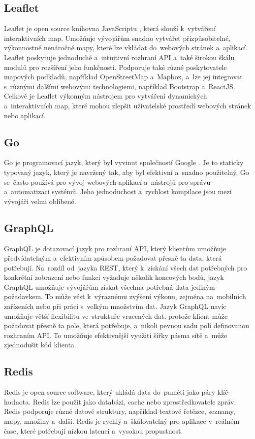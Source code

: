 \subsection{Leaflet} Leaflet je open source knihovna JavaScriptu \cite{leaflet}, která slouží k~vytváření interaktivních map. Umožňuje vývojářům snadno vytvářet přizpůsobitelné, výkonnostně nenáročné mapy, které lze vkládat do~webových stránek a~aplikací. Leaflet poskytuje jednoduché a~intuitivní rozhraní API a~také širokou škálu modulů pro rozšíření jeho funkčnosti. Podporuje také různé poskytovatele mapových podkladů, například OpenStreetMap a~Mapbox, a~lze jej integrovat s~různými dalšími webovými technologiemi, například Bootstrap a~ReactJS. Celkově je Leaflet výkonným nástrojem pro vytváření dynamických a~interaktivních map, které mohou zlepšit uživatelské prostředí webových stránek nebo aplikací.
\subsection{Go} Go je programovací jazyk, který byl vyvinut společností Google \cite{go}. Je to staticky typovaný jazyk, který je navržený tak, aby byl efektivní a~snadno použitelný. Go se~často používá pro vývoj webových aplikací a~nástrojů pro správu a~automatizaci systémů. Jeho jednoduchost a~rychlost kompilace jsou mezi vývojáři velmi oblíbené.
\newpage
\subsection{GraphQL}\label{graphql} GraphQL \cite{graphql} je dotazovací jazyk pro rozhraní API, který klientům umožňuje předvídatelným a~efektivním způsobem požadovat přesně ta data, která potřebují. Na~rozdíl od~jazyka REST, který k~získání všech dat potřebných pro konkrétní zobrazení nebo funkci vyžaduje několik koncových bodů, jazyk GraphQL umožňuje vývojářům získat všechna potřebná data jediným požadavkem. To může vést k~výraznému zvýšení výkonu, zejména na~mobilních zařízeních nebo při práci s~velkým množstvím dat. Jazyk GraphQL navíc umožňuje větší flexibilitu ve~struktuře vracených dat, protože klient může požadovat přesně ta pole, která potřebuje, a~nikoli pevnou sadu polí definovanou rozhraním API. To umožňuje efektivnější využití šířky pásma sítě a~může zjednodušit kód klienta.
\subsection{Redis}\label{redis} Redis je open source software, který ukládá data do~paměti jako páry klíč-hodnota. Redis lze použít jako databázi, cache nebo zprostředkovatele zpráv. Redis podporuje různé datové struktury, například textové řetězce, seznamy, mapy, množiny a~další. Redis je rychlý a~škálovatelný pro aplikace v~reálném čase, které potřebují nízkou latenci a~vysokou propustnost. \cite{redis}

